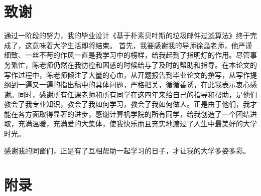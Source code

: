 \documentclass[UTF8,zihao=-4]{ctexart}
\begin{document}
\section*{致谢}
	通过一阶段的努力，我的毕业设计《基于朴素贝叶斯的垃圾邮件过滤算法》终于完成了，这意味着大学生活即将结束。
	首先，我要感谢我的导师徐晶老师，他严谨细致、一丝不苟的作风一直是我学习中的榜样，给我起到了指明灯的作用。尽管事务繁忙，陈老师仍然在我彷徨和困惑的时候给与了及时的帮助和指导。在本论文的写作过程中，陈老师倾注了大量的心血，从开题报告到毕业论文的撰写，从写作提纲到一遍又一遍的指出稿中的具体问题，严格把关，循循善诱，在此我表示衷心感谢。同时，感谢所有任课老师和所有同学在这四年来给自己的指导和帮助，是他们教会了我专业知识，教会了我如何学习，教会了我如何做人。正是由于他们，我才能在各方面取得显著的进步，感谢计算机学院的所有同学，给我创造了一个团结进取，充满温暖，充满爱的大集体，使我快乐而且充实地渡过了人生中最美好的大学时光。
	
	感谢我的同窗们，正是有了互相帮助一起学习的日子，才让我的大学多姿多彩。

\appendix
\section{附录}
\zhlipsum*[10]
\end{document}
